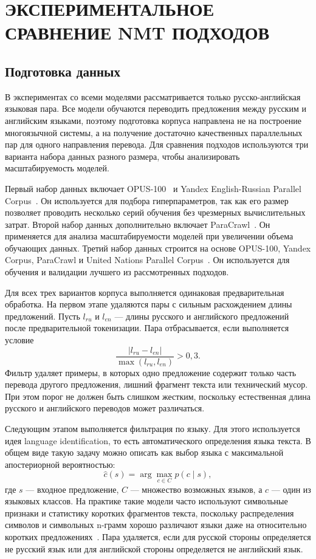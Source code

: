 \section{ЭКСПЕРИМЕНТАЛЬНОЕ СРАВНЕНИЕ NMT ПОДХОДОВ}

\subsection{Подготовка данных}

В экспериментах со всеми моделями рассматривается только русско-английская языковая пара.
Все модели обучаются переводить предложения между русским и английским языками, поэтому подготовка корпуса направлена не на построение многоязычной системы, а на получение достаточно качественных параллельных пар для одного направления перевода.
Для сравнения подходов используются три варианта набора данных разного размера, чтобы анализировать масштабируемость моделей.

Первый набор данных включает OPUS-100~\cite{opus100} и Yandex English-Russian Parallel Corpus~\cite{yandex_corpus}.
Он используется для подбора гиперпараметров, так как его размер позволяет проводить несколько серий обучения без чрезмерных вычислительных затрат.
Второй набор данных дополнительно включает ParaCrawl~\cite{paracrawl}.
Он применяется для анализа масштабируемости моделей при увеличении объема обучающих данных.
Третий набор данных строится на основе OPUS-100, Yandex Corpus, ParaCrawl и United Nations Parallel Corpus~\cite{unpc}.
Он используется для обучения и валидации лучшего из рассмотренных подходов.

Для всех трех вариантов корпуса выполняется одинаковая предварительная обработка.
На первом этапе удаляются пары с сильным расхождением длины предложений.
Пусть $l_{ru}$ и $l_{en}$ --- длины русского и английского предложений после предварительной токенизации.
Пара отбрасывается, если выполняется условие
\[
	\frac{|l_{ru} - l_{en}|}{\max(l_{ru}, l_{en})} > 0{,}3.
\]
Фильтр удаляет примеры, в которых одно предложение содержит только часть перевода другого предложения, лишний фрагмент текста или технический мусор.
При этом порог не должен быть слишком жестким, поскольку естественная длина русского и английского переводов может различаться.

Следующим этапом выполняется фильтрация по языку.
Для этого используется идея language identification, то есть автоматического определения языка текста.
В общем виде такую задачу можно описать как выбор языка с максимальной апостериорной вероятностью:
\[
	\hat{c}(s) = \arg\max_{c \in C} p(c \mid s),
\]
где $s$ --- входное предложение, $C$ --- множество возможных языков, а $c$ --- один из языковых классов.
На практике такие модели часто используют символьные признаки и статистику коротких фрагментов текста, поскольку распределения символов и символьных n-грамм хорошо различают языки даже на относительно коротких предложениях~\cite{langid}.
Пара удаляется, если для русской стороны определяется не русский язык или для английской стороны определяется не английский язык.

